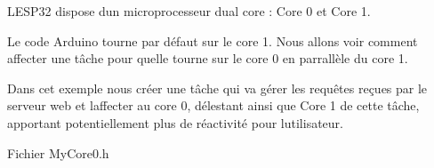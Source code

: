 L\textquotesingle{}ESP32 dispose d\textquotesingle{}un microprocesseur dual core \+: Core 0 et Core 1. 

Le code Arduino tourne par défaut sur le core 1. Nous allons voir comment affecter une tâche pour qu\textquotesingle{}elle tourne sur le core 0 en parrallèle du core 1.

Dans cet exemple nous créer une tâche qui va gérer les requêtes reçues par le serveur web et l\textquotesingle{}affecter au core 0, délestant ainsi que Core 1 de cette tâche, apportant potentiellement plus de réactivité pour l\textquotesingle{}utilisateur.

Fichier My\+Core0.\+h 